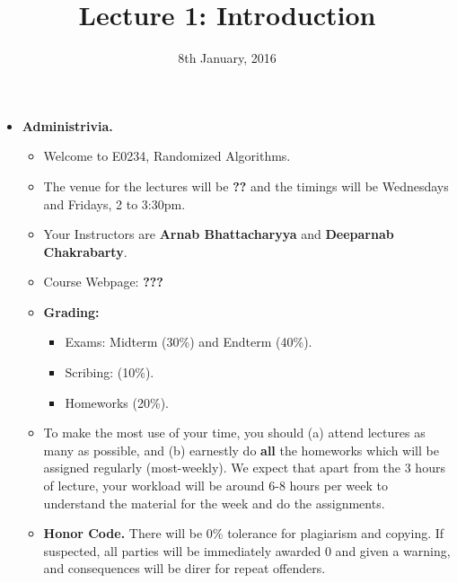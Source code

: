 \documentclass[11pt]{article}
\begin{document}
\title{Lecture 1: Introduction}
\author{}
\date{8th January, 2016}
\maketitle


\begin{itemize}
	\item {\bf Administrivia.} 
	\begin{itemize}
		\item   Welcome to E0234, Randomized Algorithms.
		\item 	The venue for the lectures will be {\bf ??} and the timings will be Wednesdays and Fridays, 2 to 3:30pm. 
		\item   Your Instructors are {\bf Arnab Bhattacharyya} and {\bf Deeparnab Chakrabarty}.
		\item  Course Webpage: {\bf ???}
		\item   {\bf Grading:} 
		\begin{itemize}
			\item Exams: Midterm (30\%) and Endterm (40\%).
			\item Scribing: (10\%).
			\item  Homeworks (20\%).
		\end{itemize}
		\item   To make the most use of your time, you should (a) attend lectures as many as possible, and (b) earnestly do {\bf all} the homeworks which will be assigned regularly (most-weekly).
				     We expect that apart from the 3 hours of lecture, your workload will be around 6-8 hours per week to understand the material for the week and do the assignments.
		\item  {\bf Honor Code.} There will be 0\% tolerance for plagiarism and copying. If suspected, all parties will be immediately awarded 0 and given a warning, and consequences will be direr for repeat offenders.
	\end{itemize}


\end{itemize}
\end{document}
